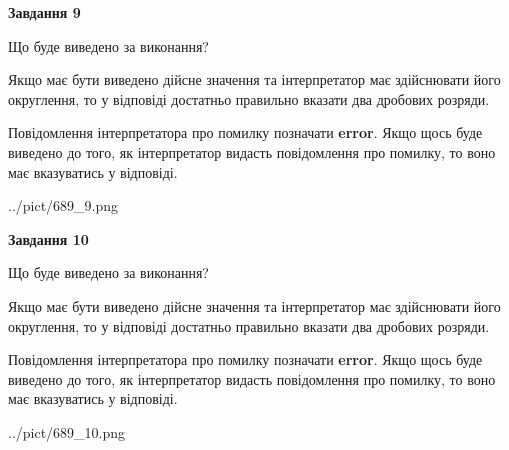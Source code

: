 \documentclass[12pt, ukrainian]{article}
\begin{document}
{\begin {Large}
{\begin {center}\textbf{Завдання 9}\end {center}}\par
Що буде виведено за виконання? \par

Якщо має бути виведено дійсне значення та інтерпретатор має здійснювати його округлення, 
то у відповіді достатньо правильно вказати два дробових розряди.

Повідомлення інтерпретатора про помилку позначати \textbf{error}.
Якщо щось буде виведено до того, як інтерпретатор видасть повідомлення про помилку, 
то воно має вказуватись у відповіді. \par

\begin{center}
	{../pict/689_9.png}
\end{center}
\newpage

{\begin {center}\textbf{Завдання 10}\end {center}}\par
Що буде виведено за виконання? \par

Якщо має бути виведено дійсне значення та інтерпретатор має здійснювати його округлення, 
то у відповіді достатньо правильно вказати два дробових розряди.

Повідомлення інтерпретатора про помилку позначати \textbf{error}.
Якщо щось буде виведено до того, як інтерпретатор видасть повідомлення про помилку, 
то воно має вказуватись у відповіді. \par

\begin{center}
	{../pict/689_10.png}
\end{center}
\newpage

\end {Large}}
\end{document}
